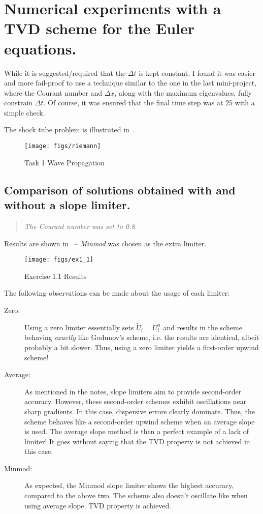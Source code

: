 
\section{Numerical experiments with a TVD scheme for the Euler equations.}

While it is suggested/required that the $\Delta t$ is kept constant, I found it was easier and more fail-proof to use a technique similar to the one in the last mini-project, where the Courant number and $\Delta x$, along with the maximum eigenvalues, fully constrain $\Delta t$. Of course, it was ensured that the final time step was at 25 with a simple check.

The shock tube problem is illustrated in~.
\begin{figure}[H]
    \centering
    \texttt{[image: figs/riemann]}
    \caption{Task 1 Wave Propagation}\label{fig:riemann}
\end{figure}

\subsection{Comparison of solutions obtained with and without a slope limiter.}
\begin{quote}
 \em \centering The Courant number was set to 0.8.
\end{quote}
Results are shown in~ -- \emph{Minmod} was chosen as the extra limiter.

\begin{figure}[H]
    \centering
    \texttt{[image: figs/ex1\_1]}
    \caption{Exercise 1.1 Results}\label{fig:ex1_1}
\end{figure}

The following observations can be made about the usage of each limiter:
\begin{description}
    \item [Zero:] Using a zero limiter essentially sets $\widetilde{U}_i = U_i^n$ and results in the scheme behaving \emph{exactly} like Godunov's scheme, i.e. the results are identical, albeit probably a bit slower. Thus, using a zero limiter yields a first-order upwind scheme!
    \item [Average:] As mentioned in the notes, slope limiters aim to provide second-order accuracy. However, these second-order schemes exhibit oscillations near sharp gradients. In this case, dispersive errors clearly dominate. Thus, the scheme behaves like a second-order upwind scheme when an average slope is used. The average slope method is then a perfect example of a lack of limiter! It goes without saying that the TVD property is not achieved in this case.
    \item [Minmod:] As expected, the Minmod slope limiter shows the highest accuracy, compared to the above two. The scheme also doesn't oscillate like when using average slope. TVD property is achieved.
\end{description}

